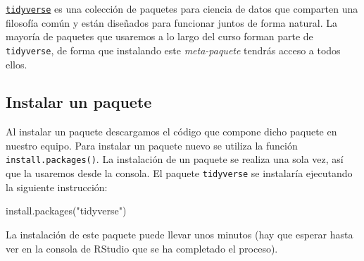 \documentclass[
  degree=mecinf,
  title=normal,
  toc=normal,
  bib=normal]{mnye}
\newenvironment{Shaded}{\begin{snugshade}}{\end{snugshade}}
\newcommand{\FunctionTok}[1]{\textcolor[rgb]{0.00,0.00,0.00}{#1}}
\newcommand{\NormalTok}[1]{#1}
\newcommand{\StringTok}[1]{\textcolor[rgb]{0.31,0.60,0.02}{#1}}
\begin{document}
\href{https://www.tidyverse.org/}{\texttt{tidyverse}} es una colección de paquetes para ciencia de datos que comparten una filosofía común y están diseñados para funcionar juntos de forma natural.
La mayoría de paquetes que usaremos a lo largo del curso forman parte de \texttt{tidyverse}, de forma que instalando este \emph{meta-paquete} tendrás acceso a todos ellos.

\hypertarget{install}{%
\subsection{Instalar un paquete}\label{install}}

Al instalar un paquete descargamos el código que compone dicho paquete en nuestro equipo.
Para instalar un paquete nuevo se utiliza la función \texttt{install.packages()}. La instalación de un paquete se realiza una sola vez, así que la usaremos desde la consola. El paquete \texttt{tidyverse} se instalaría ejecutando la siguiente instrucción:

\begin{Shaded}
\begin{Highlighting}[]
\FunctionTok{install.packages}\NormalTok{(}\StringTok{"tidyverse"}\NormalTok{)}
\end{Highlighting}
\end{Shaded}

La instalación de este paquete puede llevar unos minutos (hay que esperar hasta ver en la consola de \textsf{RStudio} que se ha completado el proceso).
\end{document}
